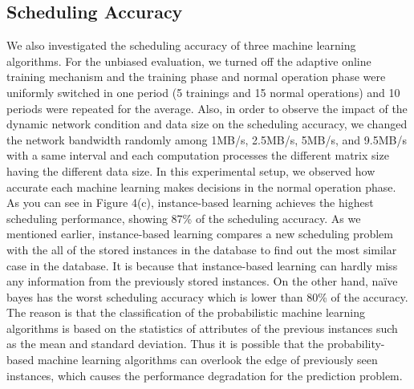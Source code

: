 \documentclass[10pt, conference, compsocconf]{IEEEtran}
\begin{document}
{\subsection{Scheduling Accuracy}
%
We also investigated the scheduling accuracy of three machine learning
algorithms.
%
For the unbiased evaluation, we turned off the adaptive online training
mechanism and the training phase and normal operation phase were
uniformly switched in one period (5 trainings and 15 normal operations)
and 10 periods were repeated for the average.
%
Also, in order to observe the impact of the dynamic network condition
and data size on the scheduling accuracy, we changed the network
bandwidth randomly among 1MB/s, 2.5MB/s, 5MB/s, and 9.5MB/s with
a same interval and each computation processes the different matrix size
having the different data size. 
%
In this experimental setup, we observed how accurate each machine
learning makes decisions in the normal operation phase.\\
%
\indent As you can see in Figure 4(c), instance-based learning achieves
the highest scheduling performance, showing 87\% of the scheduling
accuracy.  
%
As we mentioned earlier, instance-based learning compares a new
scheduling problem with the all of the stored instances in the database
to find out the most similar case in the database.
%
It is because that instance-based learning can hardly miss any
information from the previously stored instances.
%
On the other hand, na\"{i}ve bayes has the worst scheduling accuracy
which is lower than 80\% of the accuracy.
%
The reason is that the classification of the probabilistic machine
learning algorithms is based on the statistics of attributes of the
previous instances such as the mean and standard deviation.
%
Thus it is possible that the probability-based machine learning
algorithms can overlook the edge of previously seen instances, which
causes the performance degradation for the prediction problem.
%
}
\end{document}
